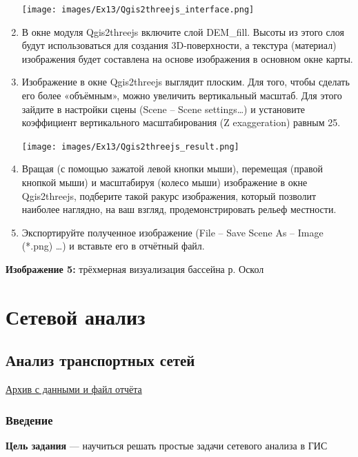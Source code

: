 \documentclass[
  12pt,
]{book}
\begin{document}
\begin{enumerate}
  \texttt{[image: images/Ex13/Qgis2threejs\_interface.png]}
\item
  В окне модуля Qgis2threejs включите слой DEM\_fill. Высоты из этого слоя будут использоваться для создания 3D-поверхности, а текстура (материал) изображения будет составлена на основе изображения в основном окне карты.
\item
  Изображение в окне Qgis2threejs выглядит плоским. Для того, чтобы сделать его более «объёмным», можно увеличить вертикальный масштаб. Для этого зайдите в настройки сцены (Scene -- Scene settings\ldots) и установите коэффициент вертикального масштабирования (Z exaggeration) равным 25.

  \texttt{[image: images/Ex13/Qgis2threejs\_result.png]}
\item
  Вращая (с помощью зажатой левой кнопки мыши), перемещая (правой кнопкой мыши) и масштабируя (колесо мыши) изображение в окне Qgis2threejs, подберите такой ракурс изображения, который позволит наиболее наглядно, на ваш взгляд, продемонстрировать рельеф местности.
\item
  Экспортируйте полученное изображение (File -- Save Scene As -- Image (*.png) \ldots) и вставьте его в отчётный файл.
\end{enumerate}

\textbf{Изображение 5:} трёхмерная визуализация бассейна р. Оскол

\hypertarget{part-ux441ux435ux442ux435ux432ux43eux439-ux430ux43dux430ux43bux438ux437}{%
\part{Сетевой анализ}\label{part-ux441ux435ux442ux435ux432ux43eux439-ux430ux43dux430ux43bux438ux437}}

\hypertarget{networks}{%
\chapter{Анализ транспортных сетей}\label{networks}}

\href{https://1drv.ms/u/s!AmtmZDq3JgxHgZ0j1tgKv_d1ElUpow?e=s0gsKz}{Архив с данными и файл отчёта}

\hypertarget{networks-intro}{%
\section{Введение}\label{networks-intro}}

\textbf{Цель задания} --- научиться решать простые задачи сетевого анализа в ГИС
\end{document}
